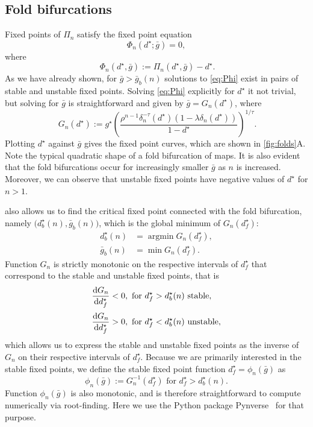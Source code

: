 \documentclass[utf8,draft]{frontiersFPHY} %
\newcommand{\dstar}{d^\star}
\newcommand{\gbar}{\bar g}
\begin{document}
\subsection{Fold bifurcations}
Fixed points of $\Pi_n$ satisfy the fixed point equation
\begin{equation}
  \label{eq:Phi}
  \Phi_n(\dstar; \gbar)=0,
\end{equation}
where
\begin{equation}
 ~\label{eq:Phi-def}
  \Phi_{n}(d^{\star}, \gbar):=\Pi_{n}(d^{\star}, \gbar)-d^{\star}.
\end{equation}
As we have already shown, for $\gbar > \gbar_b(n)$ solutions to \cref{eq:Phi} exist in pairs of stable and unstable fixed points.
Solving \cref{eq:Phi} explicitly for $\dstar$ it not trivial, but solving for $\gbar$ is straightforward and given by $\gbar = G_n(\dstar)$, where
\begin{equation}
 ~\label{eq:g}
  G_{n}(d^{\star}) := g^{\star} \left(\frac{\rho^{n-1}\delta_{n}^{-\tau}(d^{\star})(1-\lambda\delta_{n}(d^{\star}))}{1-d^{\star}}\right)^{1/\tau}.
\end{equation}
Plotting $d^{\star}$ against $\gbar$ gives the fixed point curves, which are shown in \cref{fig:folds}A.
Note the typical quadratic shape of a fold bifurcation of maps.
It is also evident that the fold bifurcations occur for increasingly smaller $\gbar$ as $n$ is increased.
Moreover, we can observe that unstable fixed points have negative values of $d^{\star}$ for $n>1$.

 also allows us to find the critical fixed point connected with the fold bifurcation, namely $\big(\dstar_{b}(n), \gbar_{b}(n)\big)$, which is the global minimum of $G_{n}(\dstar_f)$:
\begin{align}
  \dstar_{b}(n) &= \operatorname{argmin} G_{n}(\dstar_{f}),\\
  \gbar_{b}(n)  &= \min{G_{n}(\dstar_{f})}.
\end{align}
Function $G_{n}$ is strictly monotonic on the respective intervals of $\dstar_f$ that correspond to the stable and unstable fixed points, that is
\begin{align}
  \dv{G_n}{\dstar_f}& < 0, \text{ for } \dstar_f>\dstar_b(n) \text{ stable},\\[0.5ex]
  \dv{G_n}{\dstar_f}& > 0, \text{ for } \dstar_f<\dstar_b(n) \text{ unstable},
\end{align}
which allows us to express the stable and unstable fixed points as the inverse of $G_n$ on their respective intervals of $\dstar_f$.
Because we are primarily interested in the stable fixed points, we define the stable fixed point function $\dstar_f=\phi_n(\gbar)$ as
\begin{equation}
  \label{eq:phi}
  \phi_{n}(\gbar):= G_{n}^{-1}(\dstar_{f}) \text{ for } \dstar_{f}>\dstar_{b}(n).
\end{equation}
Function $\phi_n(\gbar)$ is also monotonic, and is therefore straightforward to compute numerically via root-finding.
Here we use the Python package Pynverse~\citep{pynverse} for that purpose.
\end{document}
